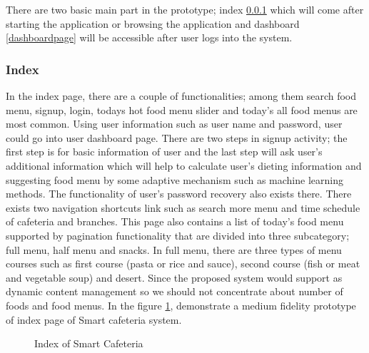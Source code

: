 There are two basic main part in the prototype; index \ref{indexpage} which will
come after starting the application or browsing the application and dashboard
\ref{dashboardpage} will be accessible after user logs into the system.

\subsubsection{Index}
\label{indexpage}
In the index page, there are a couple of functionalities; among them search food
menu, signup, login, todays hot food menu slider and today's all food menus are
most common. Using user information such as user name and password, user could
go into user dashboard page. There are two steps in signup activity; the first
step is for basic information of user and the last step will ask user's
additional information which will help to calculate user's dieting information
and suggesting food menu by some adaptive mechanism such as machine learning
methods. The functionality of user's password recovery also exists there. There
exists two navigation shortcuts link such as search more menu and time schedule
of cafeteria and branches. This page also contains a list of today's food menu
supported by pagination functionality that are divided into three subcategory;
full menu, half menu and snacks. In full menu, there are three types of menu
courses such as first course (pasta or rice and sauce), second course (fish or
meat and vegetable soup) and desert. Since the proposed system would support as
dynamic content management so we should not concentrate about number of foods
and food menus. In the figure \ref{PLindex}, demonstrate a medium fidelity
prototype of index page of Smart cafeteria system.

\begin{figure}[h!t]
    \centering
  \caption{Index of Smart Cafeteria}
  \label{PLindex}
\end{figure}

